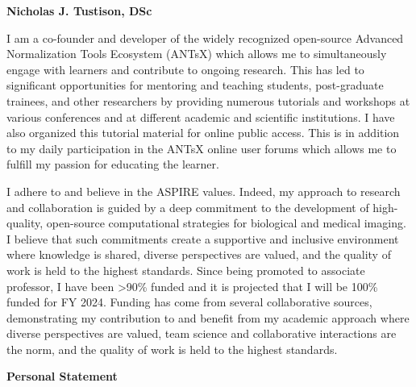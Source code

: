 \documentclass[
  11pt,
]{article}
\author{}
\date{\vspace{-2.5em}}
\begin{document}

\textbf{Nicholas J. Tustison, DSc}

I am a co-founder and developer of the widely recognized open-source
Advanced Normalization Tools Ecosystem (ANTsX) which allows me to
simultaneously engage with learners and contribute to ongoing research.
This has led to significant opportunities for mentoring and teaching
students, post-graduate trainees, and other researchers by providing
numerous tutorials and workshops at various conferences and at different
academic and scientific institutions. I have also organized this
tutorial material for online public access. This is in addition to my
daily participation in the ANTsX online user forums which allows me to
fulfill my passion for educating the learner.

I adhere to and believe in the ASPIRE values. Indeed, my approach to
research and collaboration is guided by a deep commitment to the
development of high-quality, open-source computational strategies for
biological and medical imaging. I believe that such commitments create a
supportive and inclusive environment where knowledge is shared, diverse
perspectives are valued, and the quality of work is held to the highest
standards. Since being promoted to associate professor, I have been
\textgreater90\% funded and it is projected that I will be 100\% funded
for FY 2024. Funding has come from several collaborative sources,
demonstrating my contribution to and benefit from my academic approach
where diverse perspectives are valued, team science and collaborative
interactions are the norm, and the quality of work is held to the
highest standards.

\textbf{Personal Statement}
\end{document}

